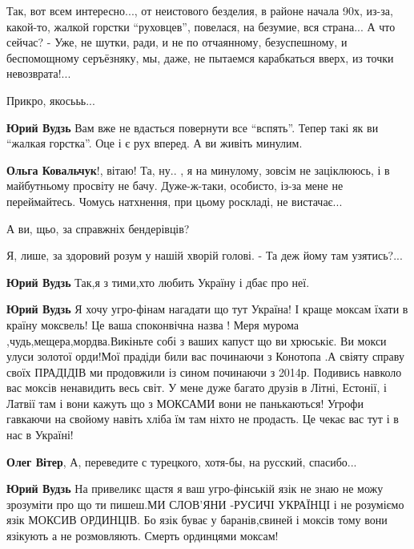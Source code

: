 
Так, вот всем интересно..., от неистового безделия, в районе начала 90х, из-за,
какой-то, жалкой горстки \enquote{руховцев}, повелася, на безумие, вся страна...
А что сейчас?
- Уже, не шутки, ради, и не по отчаянному, безуспешному, и беспомощному серъёзняку, мы, даже, не пытаемся карабкаться вверх, из точки невозврата!...

\begin{itemize}
Прикро, якосььь...

\textbf{Юрий Вудзь} Вам вже не вдасться повернути все \enquote{вспять}. Тепер
такі як ви \enquote{жалкая горстка}. Оце і є рух вперед. А ви живіть минулим.


\textbf{Ольга Ковальчук}!, вітаю!  Та, ну.. , я на минулому, зовсім не заціклююсь, і в
майбутньому просвіту не бачу. Дуже-ж-таки, особисто, із-за мене не
переймайтесь.  Чомусь натхнення, при цьому роскладі, не вистачає...

А ви, щьо, за справжніх бендерівців?

Я, лише, за здоровий розум у нашій хворій голові.
- Та деж йому там узятись?...

\textbf{Юрий Вудзь} Так,я з тими,хто любить Україну і дбає про неї.

\textbf{Юрий Вудзь} Я хочу угро-фінам нагадати що тут Україна! І краще моксам
їхати в країну моксвель! Це ваша споконвічна назва ! Меря мурома
,чудь,мещера,мордва.Викіньте собі з ваших капуст що ви хрюськіє. Ви мокси улуси
золотої орди!Мої прадіди били вас починаючи з Конотопа .А свіяту справу своїх
ПРАДІДІВ ми продовжили із сином починаючи з 2014р. Подивись навколо вас моксів
ненавидить весь світ. У мене дуже багато друзів в Літні, Естонії, і Латвії там
і вони кажуть що з МОКСАМИ вони не панькаються! Угрофи гавкаючи на свойому
навіть хліба їм там ніхто не продасть. Це чекає вас тут і в нас в Україні!

\textbf{Олег Вітер},
А, переведите с турецкого, хотя-бы, на русский, спасибо...

\textbf{Юрий Вудзь} На привеликє щастя я ваш угро-фінській язік не знаю не можу
зрозуміти про що ти пишеш.МИ СЛОВ'ЯНИ -РУСИЧІ УКРАЇНЦІ і не розуміємо язік
МОКСИВ ОРДИНЦІВ. Бо язік буває у баранів,свиней і моксів тому вони язікують а
не розмовляють. Смерть ординцями моксам!
\end{itemize}

